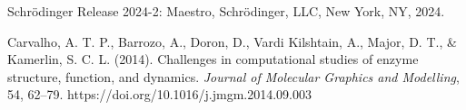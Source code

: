 \documentclass{article}
\begin{document}
\medskip




\begin{thebibliography}{9}
Schrödinger Release 2024-2: Maestro, Schrödinger, LLC, New York, NY, 2024.

Carvalho, A. T. P., Barrozo, A., Doron, D., Vardi Kilshtain, A., Major, D. T., \& Kamerlin, S. C. L. (2014). Challenges in computational studies of enzyme structure, function, and dynamics. \textit{Journal of Molecular Graphics and Modelling}, 54, 62–79. https://doi.org/10.1016/j.jmgm.2014.09.003

\end{thebibliography}
\end{document}
